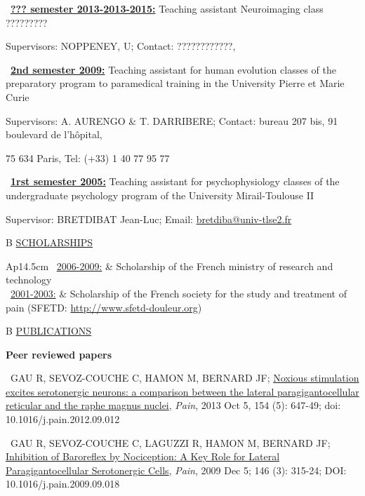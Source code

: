 \documentclass[a4paper,12pt,oneside]{letter}
\begin{document}
{\textbullet~\underline{\textbf{??? semester 2013-2013-2015:}} 	Teaching assistant Neuroimaging class ?????????

Supervisors: NOPPENEY, U; Contact: ????????????, 

\textbullet~\underline{\textbf{2nd semester 2009:}} 	Teaching assistant for human evolution classes of the preparatory program to paramedical training in the University Pierre et Marie Curie

Supervisors: A. AURENGO \& T. DARRIBERE; Contact: bureau 207 bis, 91 boulevard de l’hôpital, 

75 634 Paris, Tel: (+33) 1 40 77 95 77

\textbullet~\underline{\textbf{1rst semester 2005:}} 	Teaching assistant for psychophysiology classes of the undergraduate psychology program of the University Mirail-Toulouse II

Supervisor: BRETDIBAT Jean-Luc; Email: \href{mailto:bretdiba@univ-tlse2.fr}{bretdiba@univ-tlse2.fr}

\begin{tabular}{B}
\underline{SCHOLARSHIPS}
\end{tabular}

\begin{tabular}{Ap{14.5cm}}
\textbullet~\underline{2006-2009:} & Scholarship of the French ministry of research and technology \\
\textbullet~\underline{2001-2003:} & Scholarship of the French society for the study and treatment of pain \newline
				     (SFETD: \url{http://www.sfetd-douleur.org})
\end{tabular}

\begin{tabular}{B}
\underline{PUBLICATIONS}
\end{tabular}

\begin{center}
\Large\textbf{Peer reviewed papers}
\end{center}

\textbullet~GAU R, SEVOZ-COUCHE C, HAMON M, BERNARD JF; 
\href{http://www.painjournalonline.com/article/S0304-3959\%2812\%2900540-4/abstract}{Noxious stimulation excites serotonergic neurons: a comparison between the lateral paragigantocellular reticular and the raphe magnus nuclei}, \textit{Pain}, 2013 Oct 5, 154 (5): 647-49; doi: 10.1016/j.pain.2012.09.012

\textbullet~GAU R, SEVOZ-COUCHE C, LAGUZZI R, HAMON M, BERNARD JF; \href{http://www.painjournalonline.com/article/S0304-3959\%2809\%2900554-5/abstract}{Inhibition of Baroreflex by Nociception: A Key Role for Lateral Paragigantocellular Serotonergic Cells}, \textit{Pain}, 2009 Dec 5; 146 (3): 315-24; DOI: 10.1016/j.pain.2009.09.018

}
\end{document}
